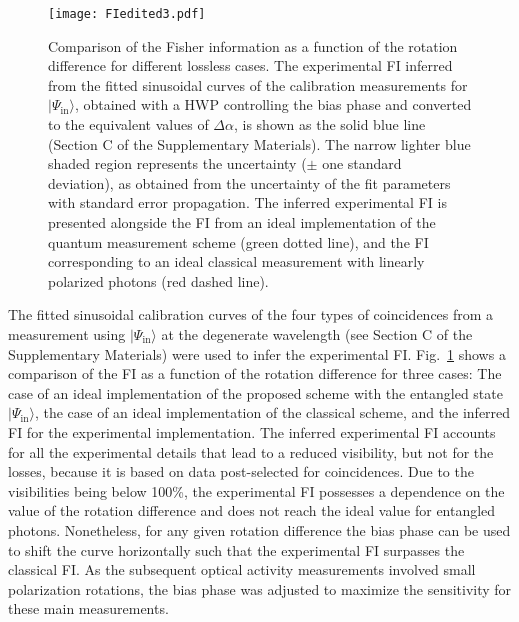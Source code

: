 \documentclass[12pt,preprint]{revtex4}
\begin{document}
\begin{figure}[htb!]
	\centering
		\texttt{[image: FIedited3.pdf]}
	\caption{Comparison of the Fisher information as a function of the rotation difference for different lossless cases. The experimental FI inferred from the fitted sinusoidal curves of the calibration measurements for $|\Psi_{\mathrm{in}}\rangle$, obtained with a HWP controlling the bias phase and converted to the equivalent values of $\Delta \alpha$, is shown as the solid blue line (Section C of the Supplementary Materials). The narrow lighter blue shaded region represents the uncertainty ($\pm$ one standard deviation), as obtained from the uncertainty of the fit parameters with standard error propagation. The inferred experimental FI is presented alongside the FI from an ideal implementation of the quantum measurement scheme (green dotted  line), and the FI corresponding to an ideal classical measurement with linearly polarized photons (red dashed line). }
	\label{fig:FI}
\end{figure}

The fitted sinusoidal calibration curves of the four types of coincidences from a measurement using $|\Psi_{\mathrm{in}}\rangle$ at the degenerate wavelength (see Section C of the Supplementary Materials) were used to infer the experimental FI. Fig.\ \ref{fig:FI} shows a comparison of the FI as a function of the rotation difference for three cases: The case of an ideal implementation of the proposed scheme with the entangled state $|\Psi_{\mathrm{in}}\rangle$, the case of an ideal implementation of the classical scheme, and the inferred FI for the experimental implementation. The inferred experimental FI accounts for all the experimental details that lead to a reduced visibility, but not for the losses, because it is based on data post-selected for coincidences. Due to the visibilities being below 100\%, the experimental FI  possesses a dependence on the value of the rotation difference and does not reach the ideal value for entangled photons. Nonetheless, for any given rotation difference the bias phase can be used to shift the curve horizontally such that the experimental FI surpasses the classical FI. As the subsequent optical activity measurements involved small polarization rotations, the bias phase was adjusted to maximize the sensitivity for these main measurements. 
\end{document}

